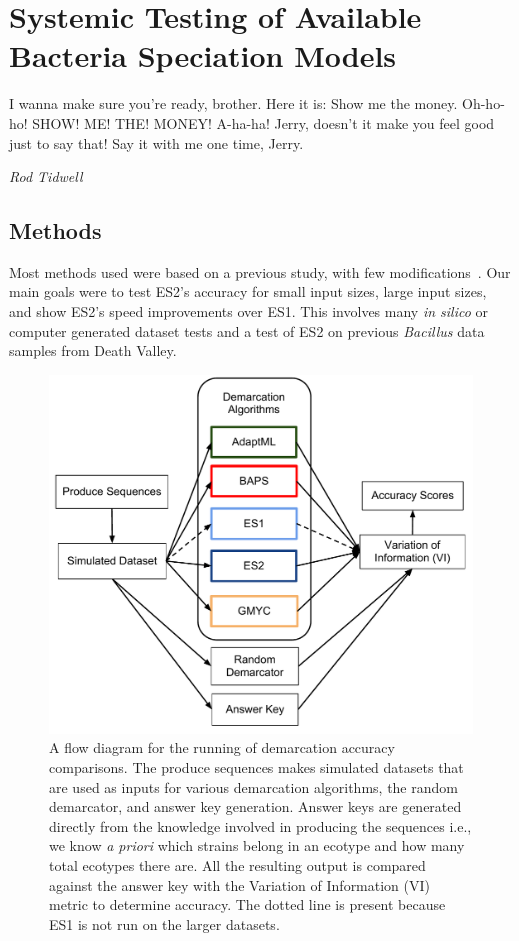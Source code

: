 \gobbletocpage
\chapter{Systemic Testing of Available Bacteria Speciation Models}
\restoretocpage

\begin{shadequote}
I wanna make sure you're ready, brother. Here it is: Show me the money. Oh-ho-ho! SHOW! ME! THE! MONEY! A-ha-ha! Jerry, doesn't it make you feel good just to say that! Say it with me one time, Jerry. \par\emph{Rod Tidwell}
\end{shadequote}


\section{Methods}
Most methods used were based on a previous study, with few modifications~\cite{carlo}.
Our main goals were to test ES2's accuracy for small input sizes, large input sizes, and show ES2's speed improvements over ES1.
This involves many \emph{in silico} or computer generated dataset tests and a test of ES2 on previous \emph{Bacillus} data samples from Death Valley.

\begin{figure}[h!]
\centering
\includegraphics[scale=0.75]{images/DemarcationComparisonsFlow-CH4}
\caption[Demarcation comparison flow diagram.]{A flow diagram for the running of demarcation accuracy comparisons. The produce sequences makes simulated datasets that are used as inputs for various demarcation algorithms, the random demarcator, and answer key generation. Answer keys are generated directly from the knowledge involved in producing the sequences i.e., we know \emph{a priori} which strains belong in an ecotype and how many total ecotypes there are. All the resulting output is compared against the answer key with the Variation of Information (VI) metric to determine accuracy. The dotted line is present because ES1 is not run on the larger datasets.}
\label{fig:ComparisonFlow}
\end{figure}

